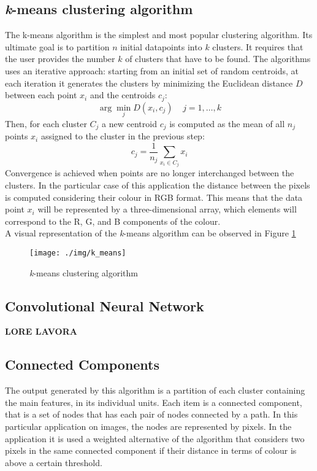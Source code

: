 \documentclass{article}
\begin{document}
{\subsection{\textit{k}-means clustering algorithm} 
The k-means algorithm is the simplest and most popular clustering algorithm. Its ultimate goal is to partition $n$ initial datapoints into $k$ clusters. It requires that the user provides the number $k$ of clusters that have to be found. The algorithms uses an iterative approach: starting from an initial set of random centroids, at each iteration it generates the clusters by minimizing the Euclidean distance $D$ between each point $x_i$  and  the centroids $c_j$:  
$$\arg \min\limits_{j}D(x_i, c_j)\;\;\;\; j = 1, \dots, k$$
Then, for each cluster $C_j$ a new centroid $c_j$ is computed as the mean of all $n_j$ points $x_i$ assigned to the cluster in the previous step: 
$$c_j = \frac{1}{n_j} \sum_{x_i \in C_j} x_i$$
Convergence is achieved when points are no longer interchanged between the clusters.
In the particular case of this application the distance between the pixels is computed considering their colour in RGB format. This means that the data point $x_i$ will be represented by a three-dimensional array, which elements will correspond to the R, G, and B components of the colour. \\
A visual representation of the \textit{k}-means algorithm can be observed in Figure \ref{fig:1}
\begin{figure}[h]
	\centering
	\texttt{[image: ./img/k\_means]}
	\caption{\textit{k}-means clustering algorithm}
	\label{fig:1}
\end{figure}

\subsection{Convolutional Neural Network}
\textbf{LORE LAVORA}

\subsection{Connected Components}
The output generated by this algorithm is a partition of each cluster containing the main features, in its individual units. Each item is a connected component, that is a set of nodes that has each pair of nodes connected by a path. In this particular application on images, the nodes are represented by pixels. In the application it is used a weighted alternative of the algorithm that considers two pixels in the same connected component if their distance in terms of colour is above a certain threshold. 

}
\end{document}
